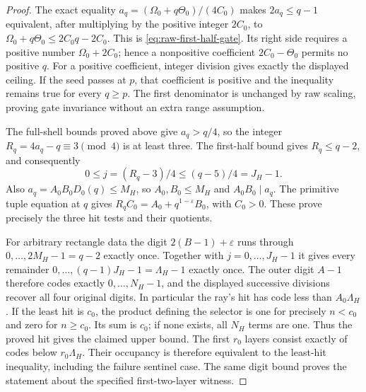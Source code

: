 \begin{proof}
The exact equality \(a_q=(\Omega_0+q\Theta_0)/(4C_0)\)
makes \(2a_q\le q-1\) equivalent, after multiplying by the
positive integer \(2C_0\), to
\(\Omega_0+q\Theta_0\le2C_0q-2C_0\).
This is \eqref{eq:raw-first-half-gate}.  Its right side requires
a positive number \(\Omega_0+2C_0\); hence a nonpositive
coefficient \(2C_0-\Theta_0\) permits no positive \(q\).
For a positive coefficient, integer division gives exactly the
displayed ceiling.  If the seed passes at \(p\), that coefficient
is positive and the inequality remains true for every \(q\ge p\).
The first denominator is unchanged by raw scaling, proving gate
invariance without an extra range assumption.

The full-shell bounds proved above give \(a_q>q/4\), so the
integer \(R_q=4a_q-q\equiv3\pmod4\) is at least three.
The first-half bound gives \(R_q\le q-2\), and consequently
\[
 0\le j=(R_q-3)/4\le(q-5)/4=J_H-1.
\]
Also \(a_q=A_0B_0D_0(q)\le M_H\), so
\(A_0,B_0\le M_H\) and \(A_0B_0\mid a_q\).
The primitive tuple equation at \(q\) gives
\(R_qC_0=A_0+q^{1-\varepsilon}B_0\), with \(C_0>0\).
These prove precisely the three hit tests and their quotients.

For arbitrary rectangle data the digit
\(2(B-1)+\varepsilon\) runs through
\(0,\ldots,2M_H-1=q-2\) exactly once.
Together with \(j=0,\ldots,J_H-1\) it gives every remainder
\(0,\ldots,(q-1)J_H-1=\Lambda_H-1\) exactly once.
The outer digit \(A-1\) therefore codes exactly
\(0,\ldots,N_H-1\), and the displayed successive divisions
recover all four original digits.  In particular the ray's hit
has code less than \(A_0\Lambda_H\).
If the least hit is \(c_0\), the product defining the selector
is one for precisely \(n<c_0\) and zero for \(n\ge c_0\).
Its sum is \(c_0\); if none exists, all \(N_H\) terms are one.
Thus the proved hit gives the claimed upper bound.  The first
\(r_0\) layers consist exactly of codes below \(r_0\Lambda_H\).
Their occupancy is therefore equivalent to the least-hit inequality,
including the failure sentinel case.  The same digit bound proves
the statement about the specified first-two-layer witness.


\end{proof}
